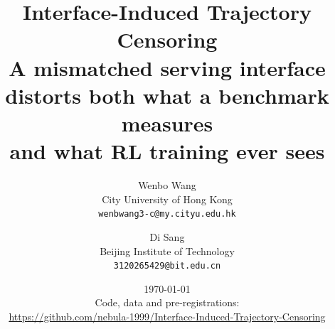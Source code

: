 \documentclass[11pt]{article}
\title{\textbf{Interface-Induced Trajectory Censoring}\\[0.3em]
\large A mismatched serving interface distorts both what a benchmark measures\\
and what RL training ever sees}
\author{
Wenbo Wang\\
City University of Hong Kong\\
\texttt{wenbwang3-c@my.cityu.edu.hk}
\and
Di Sang\\
Beijing Institute of Technology\\
\texttt{3120265429@bit.edu.cn}
}
\date{\today\\[0.6em]
\normalsize Code, data and pre-registrations:\\[0.15em]
\normalsize\url{https://github.com/nebula-1999/Interface-Induced-Trajectory-Censoring}}
\begin{document}
\maketitle

\begin{abstract}

\end{abstract}

\label{end:01_intro}
\label{end:02_related}
\label{end:03_setup}
\label{end:04_control}
\label{end:05_results}
\label{end:06_discussion}
\label{end:07_limitations}
\label{end:08_conclusion}

\label{endofbody}



\appendix









\end{document}

